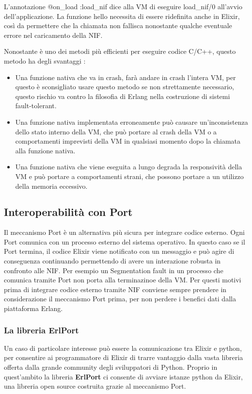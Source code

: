L'annotazione @on\_load :load\_nif dice alla VM di eseguire load\_nif/0
all'avvio dell'applicazione.
La funzione hello necessita di essere ridefinita anche in Elixir,
così da permettere che la chiamata non fallisca nonostante qualche
eventuale errore nel caricamento della NIF.

Nonostante è uno dei metodi più efficienti per eseguire codice C/C++,
questo metodo ha degli svantaggi \cite{Erlanger73:online}:

\begin{itemize}
	\item Una funzione nativa che va in crash, farà andare in crash l'intera
	VM, per questo è sconsigliato usare questo metodo se non strettamente necessario,
	questo rischio va contro la filosofia di Erlang nella costruzione di sistemi
	fault-tolerant.
	\item Una funzione nativa implementata erroneamente può causare
	un'inconsistenza dello stato interno della VM, che può portare 
	al crash della VM o a comportamenti imprevisti della VM in 
	qualsiasi momento dopo la chiamata alla funzione nativa.
	\item Una funzione nativa che viene eseguita a lungo degrada la
	responsività della VM e può portare a comportamenti strani, che possono
	portare a un utilizzo della memoria eccessivo.
\end{itemize}

\subsection{Interoperabilità con Port}

Il meccanismo Port è un alternativa più sicura per
integrare codice esterno. Ogni Port comunica con un
processo esterno del sistema operativo.
In questo caso se il Port termina, il codice Elixir
viene notificato con un messaggio e può agire di conseguenza
continuando permettendo di avere un interazione robusta
in confronto alle NIF. Per esempio un Segmentation fault
in un processo che comunica tramite Port non porta alla
terminazinoe della VM. Per questi motivi prima di integrare
codice esterno tramite NIF conviene sempre prendere in considerazione
il meccanismo Port prima, per non perdere i benefici dati dalla
piattaforma Erlang.

\subsubsection{La libreria ErlPort}
Un caso di particolare interesse può essere la comunicazione
tra Elixir e python, per consentire ai programmatore di Elixir
di trarre vantaggio dalla vasta libreria offerta dalla grande
community degli sviluppatori di Python.
Proprio in quest'ambito la libreria \textbf{ErlPort} ci consente
di avviare istanze python da Elixir, una libreria open source
costruita grazie al meccanismo Port.
